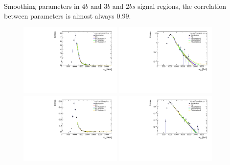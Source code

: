\begin{table}[htbp!]
\begin{center}

\caption{Smoothing parameters in $4b$ and $3b$ and $2bs$ signal regions, the correlation between parameters is almost always 0.99.}
\label{tab:smoothparams_l}
\end{center}
\end{table}


\begin{figure}[htbp!]
\begin{center}
\includegraphics[width=0.45\textwidth,angle=-90]{figures/boosted/Smooth/qcd_est_FourTag_Signal_mHH_l.pdf}
\includegraphics[width=0.45\textwidth,angle=-90]{figures/boosted/Smooth/qcd_est_FourTag_Signal_mHH_l_l.pdf}\\ 
\includegraphics[width=0.45\textwidth,angle=-90]{figures/boosted/Smooth/ttbar_est_FourTag_Signal_mHH_l.pdf}
\includegraphics[width=0.45\textwidth,angle=-90]{figures/boosted/Smooth/ttbar_est_FourTag_Signal_mHH_l_l.pdf}\\

\end{center}
\end{figure}
